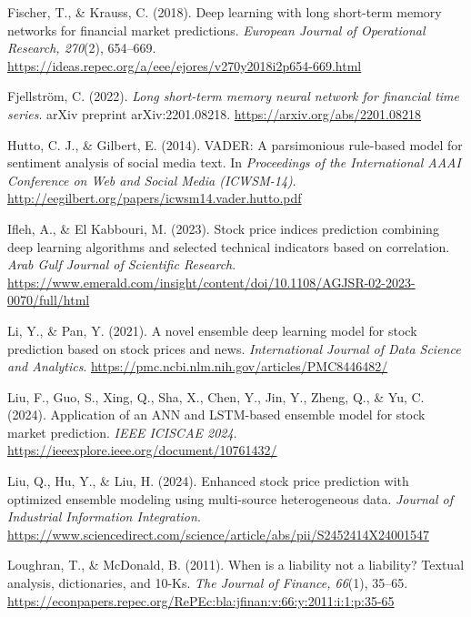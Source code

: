\documentclass[12pt,a4paper]{report}
\numberwithin{equation}{chapter}
\begin{document}
\begin{list}{}{
  \setlength{\leftmargin}{0.5in}
  \setlength{\itemindent}{-0.5in}
  \setlength{\itemsep}{4pt}
  \setlength{\parsep}{0pt}
  \setlength{\topsep}{2pt}
}
\item Fischer, T., \& Krauss, C. (2018). Deep learning with long short-term memory networks for financial market predictions. \textit{European Journal of Operational Research, 270}(2), 654--669. \url{https://ideas.repec.org/a/eee/ejores/v270y2018i2p654-669.html}

\item Fjellstr\"om, C. (2022). \textit{Long short-term memory neural network for financial time series}. arXiv preprint arXiv:2201.08218. \url{https://arxiv.org/abs/2201.08218}

\item Hutto, C. J., \& Gilbert, E. (2014). VADER: A parsimonious rule-based model for sentiment analysis of social media text. In \textit{Proceedings of the International AAAI Conference on Web and Social Media (ICWSM-14)}. \url{http://eegilbert.org/papers/icwsm14.vader.hutto.pdf}

\item Ifleh, A., \& El Kabbouri, M. (2023). Stock price indices prediction combining deep learning algorithms and selected technical indicators based on correlation. \textit{Arab Gulf Journal of Scientific Research}. \url{https://www.emerald.com/insight/content/doi/10.1108/AGJSR-02-2023-0070/full/html}

\item Li, Y., \& Pan, Y. (2021). A novel ensemble deep learning model for stock prediction based on stock prices and news. \textit{International Journal of Data Science and Analytics}. \url{https://pmc.ncbi.nlm.nih.gov/articles/PMC8446482/}

\item Liu, F., Guo, S., Xing, Q., Sha, X., Chen, Y., Jin, Y., Zheng, Q., \& Yu, C. (2024). Application of an ANN and LSTM-based ensemble model for stock market prediction. \textit{IEEE ICISCAE 2024}. \url{https://ieeexplore.ieee.org/document/10761432/}

\item Liu, Q., Hu, Y., \& Liu, H. (2024). Enhanced stock price prediction with optimized ensemble modeling using multi-source heterogeneous data. \textit{Journal of Industrial Information Integration}. \url{https://www.sciencedirect.com/science/article/abs/pii/S2452414X24001547}

\item Loughran, T., \& McDonald, B. (2011). When is a liability not a liability? Textual analysis, dictionaries, and 10-Ks. \textit{The Journal of Finance, 66}(1), 35--65. \url{https://econpapers.repec.org/RePEc:bla:jfinan:v:66:y:2011:i:1:p:35-65}


\end{list}
\end{document}
